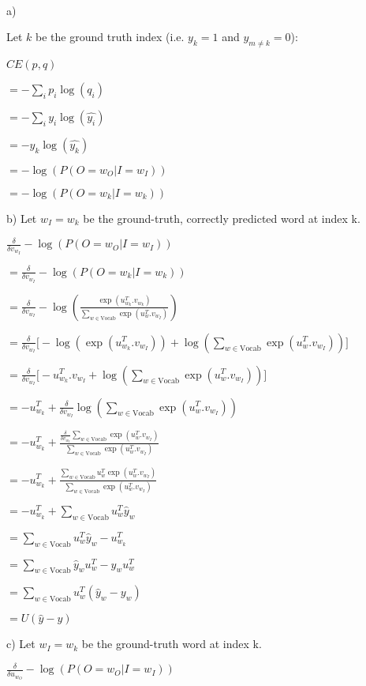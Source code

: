\begin{solution} \ \\
a)

Let $k$ be the ground truth index (i.e. $y_k = 1$ and $y_{m\neq k} = 0$):

$CE(p, q) $

$= -\sum_i p_i\log(q_i) $

$= -\sum_i y_i\log(\hat{y_i}) $

$= -y_k\log(\hat{y_k}) $

$= -\log(P(O = w_O \vert I = w_I))$

$= -\log(P(O = w_k \vert I = w_k))$

b) Let $w_I = w_k$ be the ground-truth, correctly predicted word at index k.

$\frac{\delta}{\delta v_{w_I}} -\log(P(O = w_O \vert I = w_I))$

$= \frac{\delta}{\delta v_{w_I}} -\log(P(O = w_k \vert I = w_k))$

$= \frac{\delta}{\delta v_{w_I}} -\log(\frac{\exp(u_{w_k}^T . v_{w_k})}{\sum_{w \in \text{Vocab}} \exp(u_{w}^T . v_{w_I})})$

$= \frac{\delta}{\delta v_{w_I}} \big[ -\log(\exp(u_{w_k}^T . v_{w_I})) + \log(\sum_{w \in \text{Vocab}} \exp(u_{w}^T . v_{w_I})) \big]$

$= \frac{\delta}{\delta v_{w_I}} \big[ -u_{w_k}^T . v_{w_I} + \log(\sum_{w \in \text{Vocab}} \exp(u_{w}^T . v_{w_I})) \big]$

$= -u^T_{w_k} + \frac{\delta}{\delta v_{w_I}} \log(\sum_{w \in \text{Vocab}} \exp(u_{w}^T . v_{w_I}))$

$= -u^T_{w_k} + \frac{\frac{\delta}{\delta v_{w_I}} \sum_{w \in \text{Vocab}} \exp(u_{w}^T . v_{w_I})}{\sum_{w \in \text{Vocab}} \exp(u_{w}^T . v_{w_I})}$

$= -u^T_{w_k} + \frac{\sum_{w \in \text{Vocab}} u^T_w\exp(u_{w}^T . v_{w_I})}{\sum_{w \in \text{Vocab}} \exp(u_{w}^T . v_{w_I})}$

$= -u^T_{w_k} + \sum_{w \in \text{Vocab}} u^T_w \hat{y}_w$

$= \sum_{w \in \text{Vocab}} u^T_w \hat{y}_w - u^T_{w_k}$

$= \sum_{w \in \text{Vocab}} \hat{y}_w u^T_w - y_w u^T_{w}$

$= \sum_{w \in \text{Vocab}} u^T_{w}(\hat{y}_w - y_w)$

$= U(\hat{y} - y)$

c) Let $w_I = w_k$ be the ground-truth word at index k.

$\frac{\delta}{\delta u_{w_O}} -\log(P(O = w_O \vert I = w_I))$


\end{solution}
